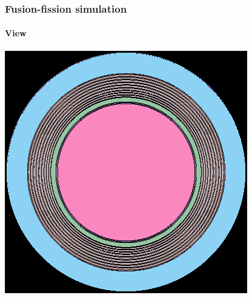 \documentclass[svgnames,smaller,table]{beamer}
\begin{document}
\begin{frame}
  \frametitle{Fusion-fission simulation}
  \framesubtitle{}

  \framesubtitle{View}
  \begin{center}
    \includegraphics[scale=0.4]{figuras/fusion.png}
  \end{center}
\end{frame}
\end{document}
